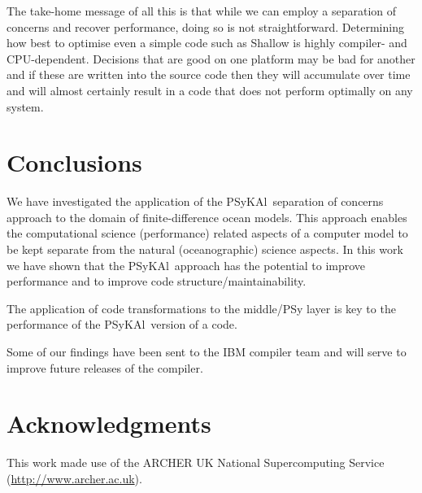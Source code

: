 \documentclass[journal]{IEEEtran}
\newcommand{\psykal}{{PS}y{KA}l\ }
\begin{document}
The take-home message of all this is that while we can employ a
separation of concerns and recover performance, doing so is not
straightforward. Determining how best to optimise even a simple code
such as Shallow is highly compiler- and CPU-dependent. Decisions that
are good on one platform may be bad for another and if these are
written into the source code then they will accumulate over time and
will almost certainly result in a code that does not perform optimally
on any system.

\section{Conclusions}

We have investigated the application of the \psykal separation of
concerns approach to the domain of finite-difference ocean
models. This approach enables the computational science (performance)
related aspects of a computer model to be kept separate from the
natural (oceanographic) science aspects. In this work we have shown
that the \psykal approach has the potential to improve performance and
to improve code structure/maintainability.

The application of code transformations to the middle/PSy layer is key
to the performance of the \psykal version of a code.

Some of our findings have been sent to the IBM compiler team and will
serve to improve future releases of the compiler.

\section*{Acknowledgments}


This work made use of the ARCHER UK National Supercomputing Service
(\url{http://www.archer.ac.uk}).



%

% 
\end{document}
